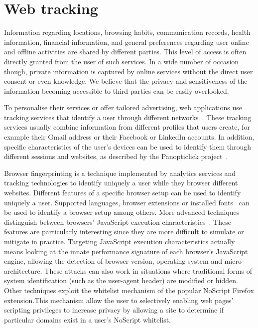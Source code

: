 \section{Web tracking}
\noindent
Information regarding locations, browsing habits, communication records, health information, financial information, and general preferences regarding user online and offline activities are shared by different parties. This level of access is often directly granted from the user of such services. In a wide number of occasion though, private information is captured by online services without the direct user consent or even knowledge. We believe that the privacy and sensitiveness of the information becoming accessible to third parties can be easily overlooked. 

To personalise their services or offer tailored advertising, web applications use tracking services that identify a user through different networks~\cite{veeningen2014line,getoor2012entity}. These tracking services usually combine information from different profiles that users create, for example their Gmail address or their Facebook or LinkedIn accounts. In addition, specific characteristics of the user's devices can be used to identify them through different sessions and websites, as described by the Panopticlick project~\cite{eckersley2010unique}.

Browser fingerprinting is a technique implemented by analytics services and tracking technologies to identify uniquely a user while they browser different websites. Different features of a specific browser setup can be used to identify uniquely a user. Supported languages, browser extensions or installed fonts~\cite{boda2012user} can be used to identify a browser setup among others. More advanced techniques distinguish between browsers' JavaScript execution characteristics~\cite{mowery2011fingerprinting}. These features are particularly interesting since they are more difficult to simulate or mitigate in practice. Targeting JavaScript execution characteristics actually means looking at the innate performance signature of each browser's JavaScript engine, allowing the detection of browser version, operating system and micro-architecture. These attacks can also work in situations where traditional forms of system identification (such as the user-agent header) are modified or hidden. Other techniques exploit the whitelist mechanism of the popular NoScript Firefox extension.This mechanism allow the user to selectively enabling web pages' scripting privileges to increase privacy by allowing a site to determine if particular domains exist in a user's NoScript whitelist.

